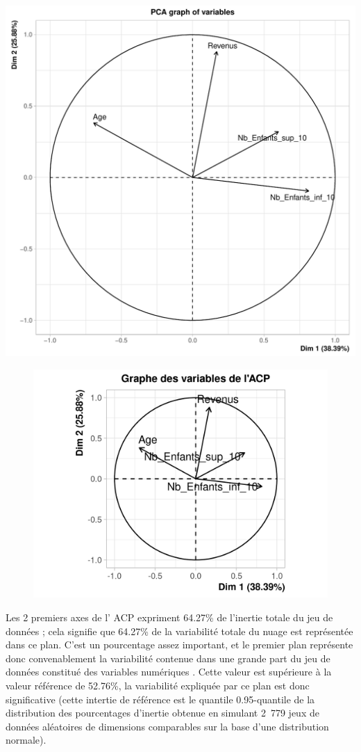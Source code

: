 \documentclass[11pt,a4paper, x11names]{article}\usepackage[]{graphicx}\usepackage[]{color}
\makeatletter
\def\maxwidth{ %
  \ifdim\Gin@nat@width>\linewidth
    \linewidth
  \else
    \Gin@nat@width
  \fi
}
\newenvironment{knitrout}{}{} %
\makeatother
\begin{document}
\begin{knitrout}
\includegraphics[width=\maxwidth]{figure/acp-2} 
\end{knitrout}

\begin{figure}[H]
\includegraphics[]{Images/graphVar.png}
\end{figure}

Les 2 premiers axes de l’ ACP  expriment 64.27\% de l’inertie totale du jeu de données ; cela signifie que 64.27\% de la variabilité totale du nuage est représentée dans ce plan. C’est un pourcentage assez important, et le premier plan représente donc convenablement la variabilité contenue dans une grande part du jeu de données constitué des variables numériques . Cette valeur est supérieure à la valeur référence de 52.76\%, la variabilité expliquée par ce plan est donc significative (cette intertie de référence est le quantile 0.95-quantile de la distribution des pourcentages d’inertie obtenue en simulant 2~779 jeux de données aléatoires de dimensions comparables sur la base d’une distribution normale).
\end{document}
